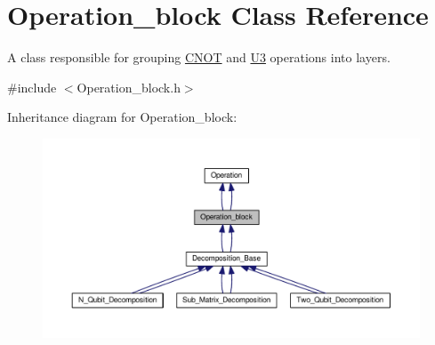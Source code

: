 \hypertarget{class_operation__block}{}\section{Operation\+\_\+block Class Reference}
\label{class_operation__block}


A class responsible for grouping \hyperlink{class_c_n_o_t}{C\+N\+OT} and \hyperlink{class_u3}{U3} operations into layers.  




{\ttfamily \#include $<$Operation\+\_\+block.\+h$>$}



Inheritance diagram for Operation\+\_\+block\+:
\nopagebreak
\begin{figure}[H]
\begin{center}
\leavevmode
\includegraphics[width=350pt]{class_operation__block__inherit__graph}
\end{center}
\end{figure}
